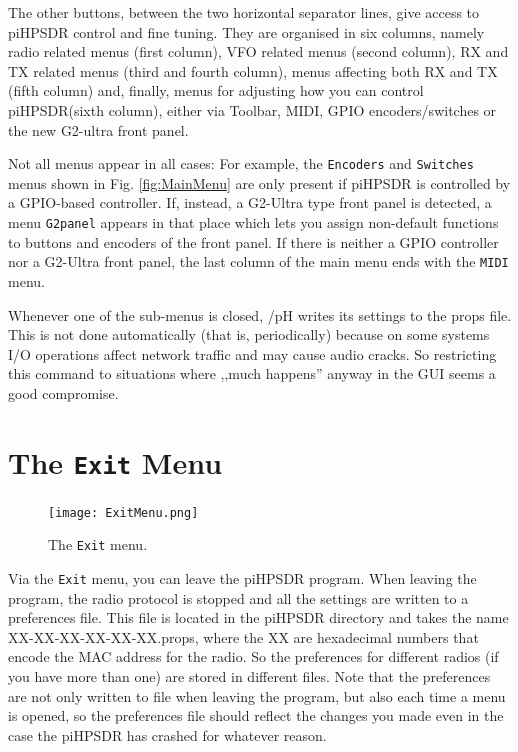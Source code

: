 \documentclass[12pt]{book}
\def\bltt#1{\texttt{\color{blue}#1}}
\def\pH{pi\-HPSDR\xspace}
\begin{document}
The other buttons, between the two horizontal separator lines, give access to \pH
control and fine tuning. They are organised in six columns, namely radio related
menus (first column), VFO related menus (second column), RX and TX related menus (third
and fourth column), menus affecting both RX and TX (fifth column) and, finally,
menus for adjusting how you can control \pH (sixth column), either via Toolbar,
MIDI, GPIO encoders/switches or the new G2-ultra front panel.

Not all menus appear in all cases: For example, the \bltt{Encoders} and \bltt{Switches}
menus shown in Fig. \ref{fig:MainMenu} are only present if \pH is controlled by
a GPIO-based controller. If, instead, a G2-Ultra type front panel is detected, a menu
\bltt{G2panel} appears in that place which lets you assign non-default functions to
buttons and encoders of the front panel. If there is neither a GPIO controller nor
a G2-Ultra front panel, the last column of the main menu ends with the \bltt{MIDI}
menu.

Whenever one of the sub-menus is closed, /pH writes its settings to the props file. This is not done
automatically (that is, periodically) because on some systems I/O operations affect
network traffic and may cause audio cracks. So restricting this command to situations
where ,,much happens'' anyway in the GUI seems a good compromise.
\section{The \texttt{Exit} Menu}

\begin{figure}[ht]
\center
\texttt{[image: ExitMenu.png]}
\caption{The \bltt{Exit} menu.}
\end{figure}

Via the \bltt{Exit} menu, you can leave the \pH program. When leaving the program,
the radio protocol is stopped and all the settings are written to a preferences file. This
file is located in the \pH directory and takes the name XX-XX-XX-XX-XX-XX.props, where
the XX are hexadecimal numbers that encode the MAC address for the radio.
So the preferences for different radios (if you
have more than one) are stored in different files.
Note that the preferences are not only written to file when leaving the program, but also each
time a menu is opened, so the preferences file should reflect the changes you made even in the
case the \pH has crashed for whatever reason.
\end{document}
